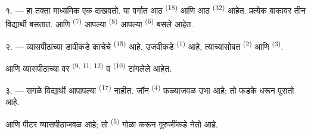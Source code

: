 %
%

\VUsaut{2.0mm}
\VUsaut{3.2mm}
\VUsaut{2.6mm}
\VUsaut{3.4mm}
\VUornamento{9pt}
\VUsaut{5.0mm}
\VUsaut{3.0mm}
\VUfilet{16mm}
\VUsaut{5.6mm}

\VUsaut{1.4mm}
\VUsaut{2.2mm}
\VUfilet{20mm}
\VUsaut{6.4mm}

\VUsaut{3.0mm}

१. --- हा तक्ता माध्यमिक  एक  दाखवतो. या वर्गात आठ
 \textsuperscript{(18)} आणि आठ  \textsuperscript{(32)}
आहेत. प्रत्येक बाकावर तीन विद्यार्थी बसतात. आणि 
\textsuperscript{(7)} आपल्या  \textsuperscript{(8)} आपल्या
 \textsuperscript{(6)} बसले आहेत.

२. --- व्यासपीठाच्या डावीकडे काचेचे  \textsuperscript{(15)} आहे.
उजवीकडे  \textsuperscript{(1)} आहे, त्याच्यासोबत 
\textsuperscript{(2)} आणि  \textsuperscript{(3)}.

आणि व्यासपीठाच्या वर  \textsuperscript{(9, 11, 12)} व
 \textsuperscript{(10)} टांगलेले आहेत.

३. --- सगळे विद्यार्थी आपापल्या  \textsuperscript{(17)} नाहीत. जॉन
\textsuperscript{(4)} फळ्याजवळ उभा आहे; तो फडके धरून 
पुसतो आहे.

आणि पीटर व्यासपीठाजवळ आहे; तो  \textsuperscript{(5)} गोळा करून
गुरुजींकडे नेतो आहे.

